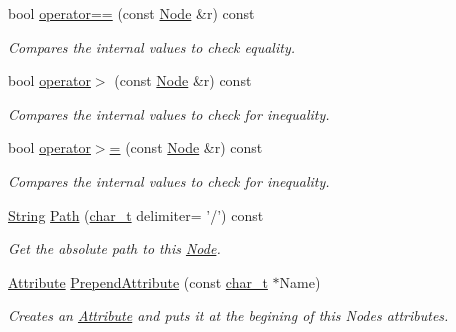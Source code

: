 \begin{DoxyCompactItemize}
bool \hyperlink{classMezzanine_1_1xml_1_1Node_a9e57cbae6135b1ca4ef2b08d7e6dcb92}{operator==} (const \hyperlink{classMezzanine_1_1xml_1_1Node}{Node} \&r) const 
\begin{DoxyCompactList}\small\item\em Compares the internal values to check equality. \item\end{DoxyCompactList}\item 
bool \hyperlink{classMezzanine_1_1xml_1_1Node_a6c2414435b19d076983579d518c98782}{operator$>$} (const \hyperlink{classMezzanine_1_1xml_1_1Node}{Node} \&r) const 
\begin{DoxyCompactList}\small\item\em Compares the internal values to check for inequality. \item\end{DoxyCompactList}\item 
bool \hyperlink{classMezzanine_1_1xml_1_1Node_aeb26816317e5e06f81d0f8c36207363a}{operator$>$=} (const \hyperlink{classMezzanine_1_1xml_1_1Node}{Node} \&r) const 
\begin{DoxyCompactList}\small\item\em Compares the internal values to check for inequality. \item\end{DoxyCompactList}\item 
\hyperlink{namespaceMezzanine_1_1xml_a3ddf35656ecc38b6fa1d0364d9ad3b2c}{String} \hyperlink{classMezzanine_1_1xml_1_1Node_a3b4b8226300b27a0f8073e4de48c1f54}{Path} (\hyperlink{namespaceMezzanine_1_1xml_a29b8a47c179e9895c4e9e66c45d1dbbc}{char\_\-t} delimiter= '/') const 
\begin{DoxyCompactList}\small\item\em Get the absolute path to this \hyperlink{classMezzanine_1_1xml_1_1Node}{Node}. \item\end{DoxyCompactList}\item 
\hyperlink{classMezzanine_1_1xml_1_1Attribute}{Attribute} \hyperlink{classMezzanine_1_1xml_1_1Node_ad339153e7b8f6bc9d3a7e4ee3aaa55d2}{PrependAttribute} (const \hyperlink{namespaceMezzanine_1_1xml_a29b8a47c179e9895c4e9e66c45d1dbbc}{char\_\-t} $\ast$Name)
\begin{DoxyCompactList}\small\item\em Creates an \hyperlink{classMezzanine_1_1xml_1_1Attribute}{Attribute} and puts it at the begining of this Nodes attributes. \item\end{DoxyCompactList}\item 

\end{DoxyCompactItemize}
